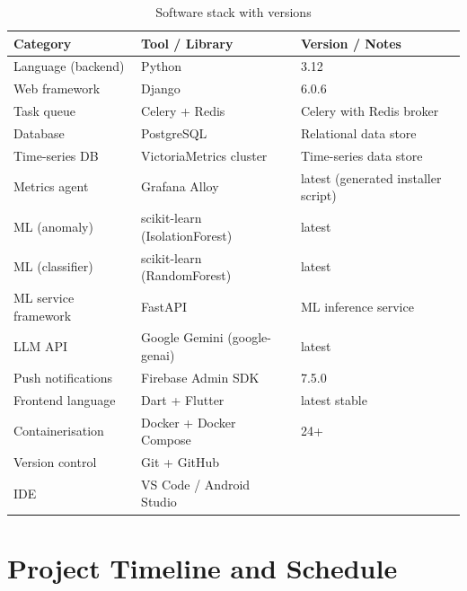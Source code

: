 \begin{table}[H]
\centering
\caption{Software stack with versions}\label{tab:sw}
\begin{tabularx}{\textwidth}{@{}l l X@{}}
\toprule
\textbf{Category} & \textbf{Tool / Library} & \textbf{Version / Notes}\\
\midrule
Language (backend)  & Python & 3.12\\
Web framework       & Django & 6.0.6\\
Task queue          & Celery + Redis & Celery with Redis broker\\
Database            & PostgreSQL & Relational data store\\
Time-series DB      & VictoriaMetrics cluster & Time-series data store\\
Metrics agent       & Grafana Alloy & latest (generated installer script)\\
ML (anomaly)        & scikit-learn (IsolationForest) & latest\\
ML (classifier)     & scikit-learn (RandomForest) & latest\\
ML service framework & FastAPI & ML inference service\\
LLM API             & Google Gemini (google-genai) & latest\\
Push notifications  & Firebase Admin SDK & 7.5.0\\
Frontend language   & Dart + Flutter & latest stable\\
Containerisation    & Docker + Docker Compose & 24+\\
Version control     & Git + GitHub & \\
IDE                 & VS Code / Android Studio & \\
\bottomrule
\end{tabularx}
\end{table}

\section{Project Timeline and Schedule}

